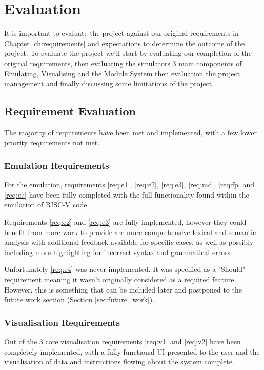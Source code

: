 \chapter{Evaluation}
\label{ch:evaluation}
It is important to evaluate the project against our original requirements in Chapter \ref{ch:requirements} and expectations to determine the outcome of the project. To evaluate the project we'll start by evaluating our completion of the original requirements, then evaluating the simulators 3 main components of Emulating, Visualising and the Module System then evaluation the project management and finally discussing some limitations of the project.

\section{Requirement Evaluation}
The majority of requirements have been met and implemented, with a few lower priority requirements not met.

\subsection{Emulation Requirements}
For the emulation, requirements \ref{req:e1}, \ref{req:e2}, \ref{req:e3}, \ref{req:md}, \ref{req:fp} and \ref{req:e7} have been fully completed with the full functionality found within the emulation of RISC-V code.

Requirements \ref{req:e2} and \ref{req:e3} are fully implemented, however they could benefit from more work to provide are more comprehensive lexical and semantic analysis with additional feedback available for specific cases, as well as possibly including more highlighting for incorrect syntax and grammatical errors.

Unfortunately \ref{req:e4} was never implemented. It was specified as a "Should" requirement meaning it wasn't originally considered as a required feature. However, this is something that can be included later and postponed to the future work section (Section \ref{sec:future_work}).

\subsection{Visualisation Requirements}
Out of the 3 core visualisation requirements \ref{req:v1} and \ref{req:v2} have been completely implemented, with a fully functional \ac{UI} presented to the user and the visualisation of data and instructions flowing about the system complete.


